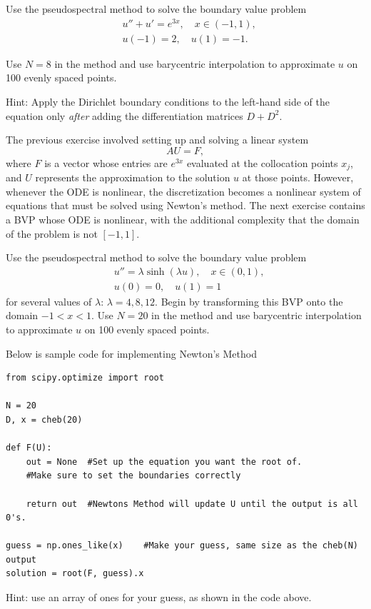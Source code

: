 \begin{problem}
	Use the pseudospectral method to solve the boundary value problem
	\begin{align*}
	&{ } u'' + u' = e^{3x}, \quad x \in (-1,1), \\
	&{ } u(-1) = 2, \quad u(1) = -1.
	\end{align*}
	
	Use $N=8$ in the  method and use barycentric interpolation to approximate $u$ on 100 evenly spaced points.

Hint: Apply the Dirichlet boundary conditions to the left-hand side of the equation only \emph{after} adding the differentiation matrices $D+D^2$.
\end{problem}

The previous exercise involved setting up and solving a linear system 
\[
AU = F,
\]
where $F$ is a vector whose entries are $e^{3x}$ evaluated at the collocation points $x_j$, and $U$ represents the approximation to the solution $u$ at those points. 
However, whenever the ODE is nonlinear, the discretization becomes a nonlinear system of equations that must be solved using Newton's method. 
The next exercise contains a BVP whose ODE is nonlinear, with the additional complexity that the domain of the problem is not $[-1,1]$. 

\begin{problem}
Use the pseudospectral method to solve the boundary value problem
\begin{align*}
&{ } u'' = \lambda\sinh(\lambda u), \quad x \in (0,1), \\
&{ } u(0) = 0, \quad u(1) = 1
\end{align*}
for several values of $\lambda$: $\lambda = 4, 8, 12$. 
Begin by transforming this BVP onto the domain $-1<x<1$.
Use $N=20$ in the  method and use barycentric interpolation to approximate $u$ on 100 evenly spaced points.
 
Below is sample code for implementing Newton's Method
\begin{lstlisting}
from scipy.optimize import root

N = 20
D, x = cheb(20)

def F(U):
	out = None	#Set up the equation you want the root of.
	#Make sure to set the boundaries correctly
	
	return out	#Newtons Method will update U until the output is all 0's.

guess = np.ones_like(x)    #Make your guess, same size as the cheb(N) output
solution = root(F, guess).x 
\end{lstlisting}

Hint: use an array of ones for your guess, as shown in the code above.
\end{problem}



